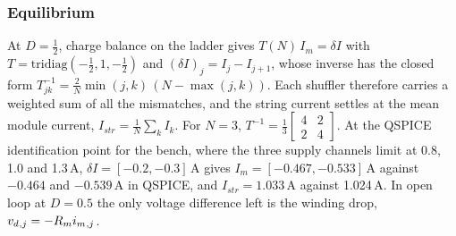 \subsubsection*{Equilibrium}
At $D = \tfrac12$, charge balance on the ladder gives $T(N)\,I_m = \delta I$ with $T = \mathrm{tridiag}(-\tfrac12, 1, -\tfrac12)$ and $(\delta I)_j = I_j - I_{j+1}$, whose inverse has the closed form $T^{-1}_{jk} = \tfrac{2}{N}\min(j,k)\,(N - \max(j,k))$. Each shuffler therefore carries a weighted sum of all the mismatches, and the string current settles at the mean module current, $I_{str} = \tfrac1N\sum_k I_k$. For $N = 3$, $T^{-1} = \tfrac13\left[\begin{smallmatrix}4&2\\2&4\end{smallmatrix}\right]$. At the QSPICE identification point for the bench, where the three supply channels limit at 0.8, 1.0 and 1.3\,A, $\delta I = [-0.2, -0.3]$\,A gives $I_m = [-0.467, -0.533]$\,A against $-0.464$ and $-0.539$\,A in QSPICE, and $I_{str} = 1.033$\,A against 1.024\,A. In open loop at $D = 0.5$ the only voltage difference left is the winding drop, $v_{d}{}_{,j} = -R_mi_{m}{}_{,j}$.


